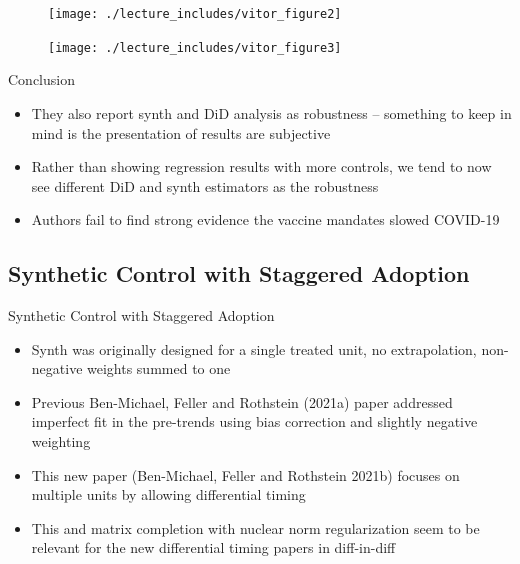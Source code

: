 \documentclass{beamer}
\begin{document}
\begin{frame}[plain]

	\begin{figure}
	\texttt{[image: ./lecture\_includes/vitor\_figure2]}
	\end{figure}

\end{frame}


\begin{frame}[plain]

	\begin{figure}
	\texttt{[image: ./lecture\_includes/vitor\_figure3]}
	\end{figure}

\end{frame}


\begin{frame}{Conclusion}

\begin{itemize}

\item They also report synth and DiD analysis as robustness -- something to keep in mind is the presentation of results are subjective
\item Rather than showing regression results with more controls, we tend to now see different DiD and synth estimators as the robustness
\item Authors fail to find strong evidence the vaccine mandates slowed COVID-19

\end{itemize}

\end{frame}


\subsection{Synthetic Control with Staggered Adoption}



\begin{frame}{Synthetic Control with Staggered Adoption}

\begin{itemize}
\item Synth was originally designed for a single treated unit, no extrapolation, non-negative weights summed to one
\item Previous Ben-Michael, Feller and Rothstein (2021a) paper addressed imperfect fit in the pre-trends using bias correction and slightly negative weighting
\item This new paper (Ben-Michael, Feller and Rothstein 2021b) focuses on multiple units by allowing differential timing
\item This and matrix completion with nuclear norm regularization seem to be relevant for the new differential timing papers in diff-in-diff
\end{itemize}

\end{frame}
\end{document}
